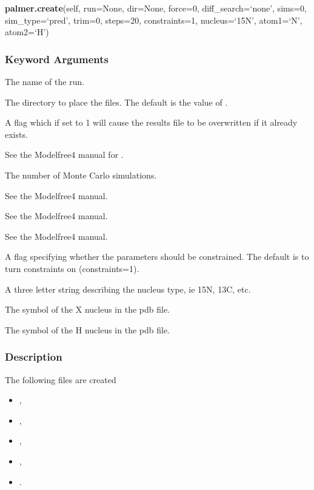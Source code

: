 \textsf{\textbf{palmer.create}(self, run=None, dir=None, force=0, diff\_search=`none', sims=0, sim\_type=`pred', trim=0, steps=20, constraints=1, nucleus=`15N', atom1=`N', atom2=`H')}


\subsubsection{Keyword Arguments}


  The name of the run.

  The directory to place the files.  The default is the value of 
.

  A flag which if set to 1 will cause the results file to be overwritten if it already exists.

  See the Modelfree4 manual for 
.

  The number of Monte Carlo simulations.

  See the Modelfree4 manual.

  See the Modelfree4 manual.

  See the Modelfree4 manual.

  A flag specifying whether the parameters should be constrained.  The default is to turn constraints  on (constraints=1).

  A three letter string describing the nucleus type, ie 15N, 13C, etc.

  The symbol of the X nucleus in the pdb file.

  The symbol of the H nucleus in the pdb file.

\subsubsection{Description}

The following files are created

\begin{itemize}
\item[]     
,
\item[]     
,
\item[]     
,
\item[]     
,
\item[]     
.
\end{itemize}

